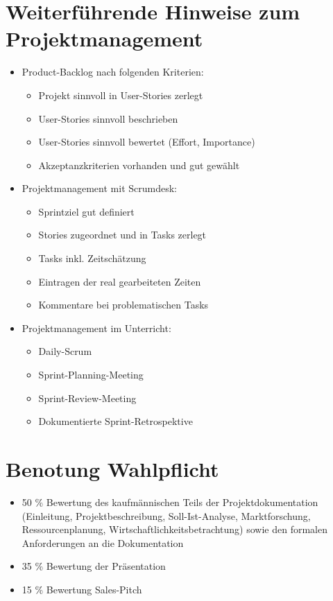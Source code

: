 \section*{Weiterführende Hinweise zum Projektmanagement}

\begin{itemize}
    \item Product-Backlog nach folgenden Kriterien:
    \begin{itemize}
        \item Projekt sinnvoll in User-Stories zerlegt
        \item User-Stories sinnvoll beschrieben
        \item User-Stories sinnvoll bewertet (Effort, Importance)
        \item Akzeptanzkriterien vorhanden und gut gewählt
    \end{itemize}
    \item Projektmanagement mit Scrumdesk:
    \begin{itemize}
        \item Sprintziel gut definiert
        \item Stories zugeordnet und in Tasks zerlegt
        \item Tasks inkl. Zeitschätzung
        \item Eintragen der real gearbeiteten Zeiten
        \item Kommentare bei problematischen Tasks
    \end{itemize}
    \item Projektmanagement im Unterricht:
    \begin{itemize}
        \item Daily-Scrum
        \item Sprint-Planning-Meeting
        \item Sprint-Review-Meeting
        \item Dokumentierte Sprint-Retrospektive
    \end{itemize}
\end{itemize}

\section*{Benotung Wahlpflicht}

\begin{itemize}
    \item 50 \% Bewertung des kaufmännischen Teils der Projektdokumentation (Einleitung, Projektbeschreibung, Soll-Ist-Analyse, Marktforschung, Ressourcenplanung, Wirtschaftlichkeitsbetrachtung) sowie den formalen Anforderungen an die Dokumentation
    \item 35 \% Bewertung der Präsentation
    \item 15 \% Bewertung Sales-Pitch
\end{itemize}

